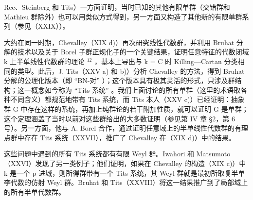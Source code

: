 Ree、Steinberg 和 Tits）一方面证明，当时已知的其他有限单群（交错群和 Mathieu 群除外）也可以用类似方式得到，另一方面又构造了其他新的有限单群系列（参见（XXIX））。

大约在同一时期，Chevalley（XIX d)）再次研究线性代数群，并利用 Bruhat 分解的技术以及关于 Borel 子群正规化子的一个关键结果，证明任意特征的代数闭域 k 上半单线性代数群的理论 \(^{12}\) ，基本上导出与 k = C 时 Killing—Cartan 分类相同的类型。此后，J. Tits（XXV a) 和 b)）分析 Chevalley 的方法，得到 Bruhat 分解的公理化版本（即 ``BN-对'' ）；这个版本具有极其灵活的形式，只涉及群结构；这一概念如今称为 ``Tits 系统'' 。我们上面讨论的所有单群（这里的术语取各种不同含义）都规范地带有 Tits 系统，而 Tits 本人（XXV c)）已经证明：抽象群 G 中存在这样的系统，再加上纯群论的若干附加性质，就可以证明 G 是单群；这个定理涵盖了当时以前对这些群给出的大多数证明（参见第 IV 章 §2，第 6 号）。另一方面，他与 A. Borel 合作，通过证明任意域上的半单线性代数群的有理点群中存在 Tits 系统（XXVII），推广了 Chevalley 在（XIX d)）中的结果。

这些问题中遇到的所有 Tits 系统都有有限 Weyl 群。Iwahori 和 Matsumoto（XXVI）发现了另一类例子；他们证明，如果在 Chevalley 的构造（XIX c)）中 k 是一个 p 进域，则所得群带有一个 Tits 系统，其 Weyl 群就是最初所取复半单李代数的仿射 Weyl 群。Bruhat 和 Tits（XXVIII）将这一结果推广到了局部域上的所有半单代数群。


